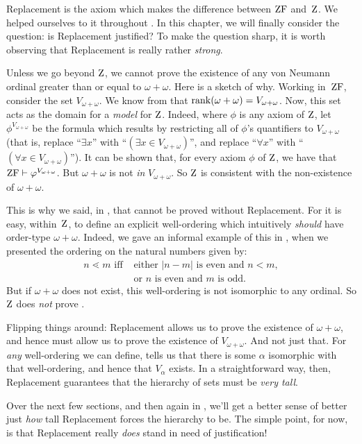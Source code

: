 \documentclass[../../../include/open-logic-section]{subfiles}
\begin{document}

Replacement is the axiom which makes the difference between $\mathrm{ZF}$
and~$\mathrm{Z}$. We helped ourselves to it throughout
. In this chapter, we
will finally consider the question: is Replacement justified? To make
the question sharp, it is worth observing that Replacement is really
rather \emph{strong}.

Unless we go beyond $\mathrm{Z}$, we cannot prove the existence of any von
Neumann ordinal greater than or equal to $\omega + \omega$. Here is a
sketch of why. Working in~$\mathrm{ZF}$, consider the set $V_{\omega+\omega}$.
We know from  that
$\mathrm{rank}(\omega+\omega) = V_{\omega+\omega}$. Now, this set acts as
the domain for a  \emph{model} for $\mathrm{Z}$. Indeed, where $\phi$ is any
axiom of $\mathrm{Z}$, let $\phi^{V_{\omega+\omega}}$ be the formula which
results by restricting all of $\phi$'s quantifiers to
$V_{\omega+\omega}$ (that is, replace ``$\exists x$'' with ``$(\exists
x \in V_{\omega+\omega})$'', and replace ``$\forall x$'' with
``$(\forall x \in V_{\omega+\omega})$''). It can be shown that, for
every axiom $\phi$ of $\mathrm{Z}$, we have that $\mathrm{ZF} \vdash
\varphi^{V_{\omega+\omega}}$. But $\omega+\omega$ is not \emph{in}
$V_{\omega+\omega}$. So $\mathrm{Z}$ is consistent with the non-existence of
$\omega+\omega$.

This is why we said, in , that
 cannot be proved
without Replacement. For it is easy, within~$\mathrm{Z}$, to define an
explicit well-ordering which intuitively \emph{should} have order-type
$\omega+\omega$. Indeed, we gave an informal example of this in
, when we presented the ordering on the
natural numbers given by:
\begin{align*}
	n \lessdot m\text{ iff }&\text{either $|n - m|$ is even and $n < m$},\\
	& \text{or $n$ is even and $m$ is odd.}
\end{align*}
 But if $\omega+\omega$ does not exist, this well-ordering is not
 isomorphic to any ordinal. So $\mathrm{Z}$ does \emph{not} prove
 . 

Flipping things around: Replacement allows us to prove the existence
of $\omega+\omega$, and hence must allow us to prove the existence of
$V_{\omega+\omega}$. And not just that. For \emph{any} well-ordering
we can define, 
tells us that there is some $\alpha$ isomorphic with that
well-ordering, and hence that $V_\alpha$ exists. In a straightforward
way, then, Replacement guarantees that the hierarchy of sets must be
\emph{very tall}. 

Over the next few sections, and then again in
, we'll get a better sense of better
just \emph{how} tall Replacement forces the hierarchy to be. The
simple point, for now, is that Replacement really \emph{does} stand in
need of justification!
\end{document}
